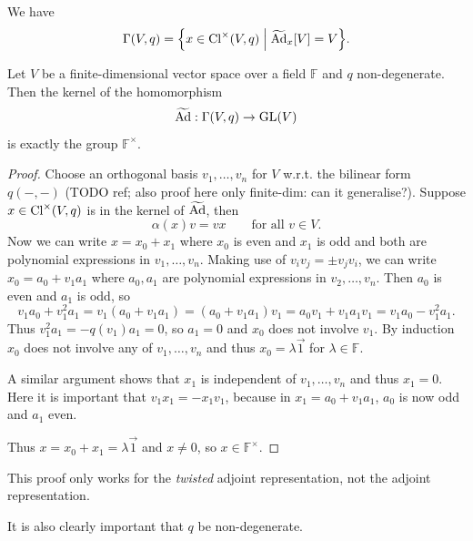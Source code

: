 We have
\[ \Gamma(V,q) = \setbuilder{x\in\Cl^\times(V,q)}{\widetilde{\Ad}_x[V] = V}. \]

\begin{proposition}
Let $V$ be a finite-dimensional vector space over a field $\mathbb{F}$ and $q$ non-degenerate. Then the kernel of the homomorphism
\[ \widetilde{\operatorname{Ad}}: \Gamma(V,q) \to \operatorname{GL}(V) \]
is exactly the group $\mathbb{F}^\times$.
\end{proposition}
\begin{proof}
Choose an orthogonal basis $v_1,\ldots, v_n$ for $V$ w.r.t. the bilinear form $q(-,-)$ (TODO ref; also proof here only finite-dim: can it generalise?). Suppose $x\in \operatorname{Cl}^\times(V,q)$ is in the kernel of $\widetilde{\operatorname{Ad}}$, then
\[ \alpha(x)v = vx \qquad \text{for all $v\in V$.} \]
Now we can write $x = x_0 + x_1$ where $x_0$ is even and $x_1$ is odd and both are polynomial expressions in $v_1,\ldots, v_n$. Making use of $v_iv_j = \pm v_jv_i$, we can write $x_0 = a_0 + v_1a_1$ where $a_0,a_1$ are polynomial expressions in $v_2,\ldots, v_n$. Then $a_0$ is even and $a_1$ is odd, so
\[ v_1a_0 + v_1^2a_1 = v_1(a_0+v_1a_1) = (a_0+v_1a_1)v_1 = a_0v_1 + v_1 a_1 v_1 = v_1a_0-v_1^2 a_1. \]
Thus $v^2_1a_1 = -q(v_1)a_1 = 0$, so $a_1=0$ and $x_0$ does not involve $v_1$. By induction $x_0$ does not involve any of $v_1,\ldots, v_n$ and thus $x_0 = \lambda \vec{1}$ for $\lambda\in\mathbb{F}$.

A similar argument shows that $x_1$ is independent of $v_1,\ldots, v_n$ and thus $x_1=0$. Here it is important that $v_1x_1 = -x_1v_1$, because in $x_1 = a_0 + v_1a_1$, $a_0$ is now odd and $a_1$ even.

Thus $x = x_0+x_1 = \lambda \vec{1}$ and $x\neq 0$, so $x\in \mathbb{F}^\times$.
\end{proof}
This proof only works for the \textit{twisted} adjoint representation, not the adjoint representation.

It is also clearly important that $q$ be non-degenerate.

